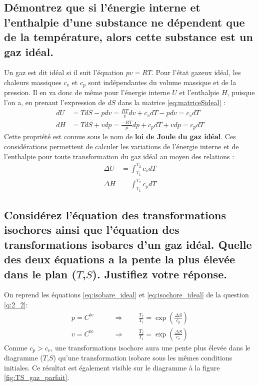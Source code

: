 \subsection{Démontrez que si l'énergie interne et l'enthalpie d'une substance ne dépendent que de la température, alors cette substance est un gaz idéal.}
Un gaz est dit idéal si il suit l'équation $pv = RT$. Pour l'état gazeux idéal, les chaleurs massiques $c_v$ et $c_p$ sont indépendantes du volume massique et de la pression. Il en va donc de même pour l'énergie interne $U$ et l'enthalpie $H$, puisque l'on a, en prenant l'expression de  $dS$ dans la matrice \ref{eq:matriceSideal} :
\begin{align} dU &= TdS - pdv = \frac{RT}{v}dv + c_vdT - pdv = c_vdT \\ dH &= TdS + vdp = \frac{-RT}{p}dp + c_pdT + vdp = c_pdT \end{align}
Cette propriété est connue sous le nom de \textbf{loi de Joule du gaz idéal}. Ces considérations permettent de calculer les variations de l'énergie interne et de l'enthalpie pour toute transformation du gaz idéal au moyen des relations :
\begin{align} \Delta U &= \int_{T_1}^{T_2}c_vdT \\ \Delta H &= \int_{T_1}^{T_2}c_pdT \end{align}

\subsection{Considérez l'équation des transformations isochores ainsi que l'équation des transformations isobares d'un gaz idéal. Quelle des deux équations a la pente la plus élevée dans le plan ($T$,$S$). Justifiez votre réponse.}
On reprend les équations \ref{eq:isobare_ideal} et \ref{eq:isochore_ideal} de la question \ref{q:2_2}:
\begin{align} p = C^\text{te} \qquad &\Rightarrow \qquad \frac{T_f}{T_i} = \exp\left(\frac{\Delta S}{c_p}\right) \\ v = C^\text{te}  \qquad &\Rightarrow \qquad \frac{T_f}{T_i} = \exp\left(\frac{\Delta S}{c_v}\right) \end{align}
Comme $c_p > c_v$, une transformations isochore aura une pente plus élevée dans le diagramme ($T$,$S$) qu'une transformation isobare sous les mêmes conditions initiales. Ce résultat est également visible sur le diagramme à la figure \ref{fig:TS_gaz_parfait}.

